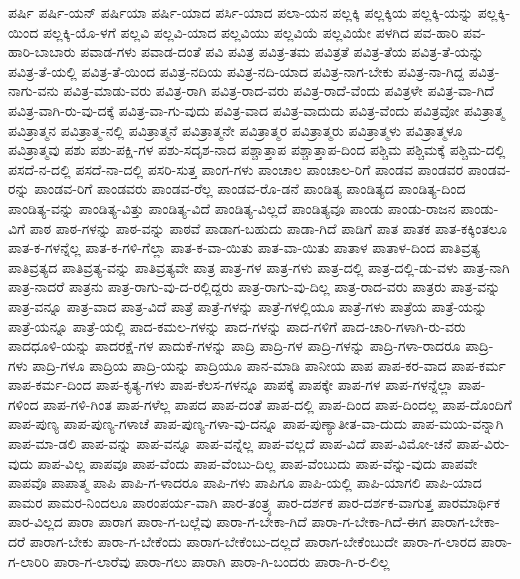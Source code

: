 {ಪರ್ಷಿ
ಪರ್ಷಿ-ಯನ್
ಪರ್ಷಿಯಾ
ಪರ್ಷಿ-ಯಾದ
ಪರ್ಸಿ-ಯಾದ
ಪಲಾ-ಯನ
ಪಲ್ಲಕ್ಕಿ
ಪಲ್ಲಕ್ಕಿಯ
ಪಲ್ಲಕ್ಕಿ-ಯನ್ನು
ಪಲ್ಲಕ್ಕಿ-ಯಿಂದ
ಪಲ್ಲಕ್ಕಿ-ಯೊ-ಳಗೆ
ಪಲ್ಲವಿ
ಪಲ್ಲವಿ-ಯಾದ
ಪಲ್ಲವಿಯು
ಪಲ್ಲವಿಯೆ
ಪಲ್ಲವಿಯೇ
ಪಳಗಿದ
ಪವ-ಹಾರಿ
ಪವ-ಹಾರಿ-ಬಾಬಾರು
ಪವಾಡ-ಗಳು
ಪವಾಡ-ದಂತೆ
ಪವಿ
ಪವಿತ್ರ
ಪವಿತ್ರ-ತಮ
ಪವಿತ್ರತೆ
ಪವಿತ್ರ-ತೆಯ
ಪವಿತ್ರ-ತೆ-ಯನ್ನು
ಪವಿತ್ರ-ತೆ-ಯಲ್ಲಿ
ಪವಿತ್ರ-ತೆ-ಯಿಂದ
ಪವಿತ್ರ-ನದಿಯ
ಪವಿತ್ರ-ನದಿ-ಯಾದ
ಪವಿತ್ರ-ನಾಗ-ಬೇಕು
ಪವಿತ್ರ-ನಾ-ಗಿದ್ದ
ಪವಿತ್ರ-ನಾಗು-ವನು
ಪವಿತ್ರ-ಮಾಡು-ವರು
ಪವಿತ್ರ-ರಾಗಿ
ಪವಿತ್ರ-ರಾದ-ವರು
ಪವಿತ್ರ-ರಾದೆ-ವೆಂದು
ಪವಿತ್ರಳೇ
ಪವಿತ್ರ-ವಾ-ಗಿದೆ
ಪವಿತ್ರ-ವಾಗಿ-ರು-ವು-ದಕ್ಕೆ
ಪವಿತ್ರ-ವಾ-ಗು-ವುದು
ಪವಿತ್ರ-ವಾದ
ಪವಿತ್ರ-ವಾದುದು
ಪವಿತ್ರ-ವೆಂದು
ಪವಿತ್ರವೋ
ಪವಿತ್ರಾತ್ಮ
ಪವಿತ್ರಾತ್ಮನ
ಪವಿತ್ರಾತ್ಮ-ನಲ್ಲಿ
ಪವಿತ್ರಾತ್ಮನೆ
ಪವಿತ್ರಾತ್ಮನೇ
ಪವಿತ್ರಾತ್ಮರ
ಪವಿತ್ರಾತ್ಮರು
ಪವಿತ್ರಾತ್ಮಳು
ಪವಿತ್ರಾತ್ಮಳೂ
ಪವಿತ್ರಾತ್ಮವು
ಪಶು
ಪಶು-ಪಕ್ಷಿ-ಗಳ
ಪಶು-ಸದೃಶ-ನಾದ
ಪಶ್ಚಾತ್ತಾಪ
ಪಶ್ಚಾತ್ತಾಪ-ದಿಂದ
ಪಶ್ಚಿಮ
ಪಶ್ಚಿಮಕ್ಕೆ
ಪಶ್ಚಿಮ-ದಲ್ಲಿ
ಪಸದೆ-ನ-ದಲ್ಲಿ
ಪಸದೆ-ನಾ-ದಲ್ಲಿ
ಪಸರಿ-ಸುತ್ತ
ಪಾಂಗ-ಗಳು
ಪಾಂಚಾಲ
ಪಾಂಚಾಲ-ರಿಗೆ
ಪಾಂಡವ
ಪಾಂಡವರ
ಪಾಂಡವ-ರನ್ನು
ಪಾಂಡವ-ರಿಗೆ
ಪಾಂಡವರು
ಪಾಂಡವ-ರೆಲ್ಲ
ಪಾಂಡವ-ರೊ-ಡನೆ
ಪಾಂಡಿತ್ಯ
ಪಾಂಡಿತ್ಯದ
ಪಾಂಡಿತ್ಯ-ದಿಂದ
ಪಾಂಡಿತ್ಯ-ವನ್ನು
ಪಾಂಡಿತ್ಯ-ವಿತ್ತು
ಪಾಂಡಿತ್ಯ-ವಿದೆ
ಪಾಂಡಿತ್ಯ-ವಿಲ್ಲದೆ
ಪಾಂಡಿತ್ಯವೂ
ಪಾಂಡು
ಪಾಂಡು-ರಾಜನ
ಪಾಂಡು-ವಿಗೆ
ಪಾಠ
ಪಾಠ-ಗಳನ್ನು
ಪಾಠ-ವನ್ನು
ಪಾಠವೆ
ಪಾಡಾಗ-ಬಹುದು
ಪಾಡಾ-ಗಿದೆ
ಪಾಡಿಗೆ
ಪಾತ
ಪಾತಕ
ಪಾತ-ಕಕ್ಕಿಂತಲೂ
ಪಾತ-ಕ-ಗಳನ್ನೆಲ್ಲ
ಪಾತ-ಕ-ಗಳಿ-ಗೆಲ್ಲಾ
ಪಾತ-ಕ-ವಾ-ಯಿತು
ಪಾತ-ವಾ-ಯಿತು
ಪಾತಾಳ
ಪಾತಾಳ-ದಿಂದ
ಪಾತಿವ್ರತ್ಯ
ಪಾತಿವ್ರತ್ಯದ
ಪಾತಿವ್ರತ್ಯ-ವನ್ನು
ಪಾತಿವ್ರತ್ಯವೇ
ಪಾತ್ರ
ಪಾತ್ರ-ಗಳ
ಪಾತ್ರ-ಗಳು
ಪಾತ್ರ-ದಲ್ಲಿ
ಪಾತ್ರ-ದಲ್ಲಿ-ಡು-ವಳು
ಪಾತ್ರ-ನಾಗಿ
ಪಾತ್ರ-ನಾದರೆ
ಪಾತ್ರನು
ಪಾತ್ರ-ರಾಗು-ವು-ದ-ರಲ್ಲಿದ್ದರು
ಪಾತ್ರ-ರಾಗು-ವು-ದಿಲ್ಲ
ಪಾತ್ರ-ರಾದ-ವರು
ಪಾತ್ರರು
ಪಾತ್ರ-ವನ್ನು
ಪಾತ್ರ-ವನ್ನೂ
ಪಾತ್ರ-ವಾದ
ಪಾತ್ರ-ವಿದೆ
ಪಾತ್ರೆ
ಪಾತ್ರೆ-ಗಳನ್ನು
ಪಾತ್ರೆ-ಗಳಲ್ಲಿಯೂ
ಪಾತ್ರೆ-ಗಳು
ಪಾತ್ರೆಯ
ಪಾತ್ರೆ-ಯನ್ನು
ಪಾತ್ರೆ-ಯನ್ನೂ
ಪಾತ್ರೆ-ಯಲ್ಲಿ
ಪಾದ-ಕಮಲ-ಗಳನ್ನು
ಪಾದ-ಗಳನ್ನು
ಪಾದ-ಗಳಿಗೆ
ಪಾದ-ಚಾರಿ-ಗಳಾಗಿ-ರು-ವರು
ಪಾದಧೂಳಿ-ಯನ್ನು
ಪಾದರಕ್ಷೆ-ಗಳ
ಪಾದುಕೆ-ಗಳನ್ನು
ಪಾದ್ರಿ
ಪಾದ್ರಿ-ಗಳ
ಪಾದ್ರಿ-ಗಳನ್ನು
ಪಾದ್ರಿ-ಗಳಾ-ರಾದರೂ
ಪಾದ್ರಿ-ಗಳು
ಪಾದ್ರಿ-ಗಳೂ
ಪಾದ್ರಿಯ
ಪಾದ್ರಿ-ಯನ್ನು
ಪಾದ್ರಿಯೂ
ಪಾನ-ಮಾಡಿ
ಪಾನೀಯ
ಪಾಪ
ಪಾಪ-ಕರ-ವಾದ
ಪಾಪ-ಕರ್ಮ
ಪಾಪ-ಕರ್ಮ-ದಿಂದ
ಪಾಪ-ಕೃತ್ಯ-ಗಳು
ಪಾಪ-ಕೆಲಸ-ಗಳನ್ನೂ
ಪಾಪಕ್ಕೆ
ಪಾಪಕ್ಕೇ
ಪಾಪ-ಗಳ
ಪಾಪ-ಗಳನ್ನೆಲ್ಲಾ
ಪಾಪ-ಗಳಿಂದ
ಪಾಪ-ಗಳಿ-ಗಿಂತ
ಪಾಪ-ಗಳೆಲ್ಲ
ಪಾಪದ
ಪಾಪ-ದಂತೆ
ಪಾಪ-ದಲ್ಲಿ
ಪಾಪ-ದಿಂದ
ಪಾಪ-ದಿಂದಲ್ಲ
ಪಾಪ-ದೊಂದಿಗೆ
ಪಾಪ-ಪುಣ್ಯ
ಪಾಪ-ಪುಣ್ಯ-ಗಳಾಚೆ
ಪಾಪ-ಪುಣ್ಯ-ಗಳಾ-ವು-ದನ್ನೂ
ಪಾಪ-ಪುಣ್ಯಾತೀತ-ವಾ-ದುದು
ಪಾಪ-ಮಯ-ವನ್ನಾಗಿ
ಪಾಪ-ಮಾ-ಡಲಿ
ಪಾಪ-ವನ್ನು
ಪಾಪ-ವನ್ನೂ
ಪಾಪ-ವನ್ನೆಲ್ಲ
ಪಾಪ-ವಲ್ಲದೆ
ಪಾಪ-ವಿದೆ
ಪಾಪ-ವಿಮೋ-ಚನೆ
ಪಾಪ-ವಿರು-ವುದು
ಪಾಪ-ವಿಲ್ಲ
ಪಾಪವೂ
ಪಾಪ-ವೆಂದು
ಪಾಪ-ವೆಂಬು-ದಿಲ್ಲ
ಪಾಪ-ವೆಂಬುದು
ಪಾಪ-ವೆನ್ನು-ವುದು
ಪಾಪವೇ
ಪಾಪವೊ
ಪಾಪಾತ್ಮ
ಪಾಪಿ
ಪಾಪಿ-ಗ-ಳಾದರೂ
ಪಾಪಿ-ಗಳು
ಪಾಪಿಗೂ
ಪಾಪಿ-ಯಲ್ಲಿ
ಪಾಪಿ-ಯಾಗಲಿ
ಪಾಪಿ-ಯಾದ
ಪಾಮರ
ಪಾಮರ-ನಿಂದಲೂ
ಪಾರಂಪರ್ಯ-ವಾಗಿ
ಪಾರ-ತಂತ್ರ್ಯ
ಪಾರ-ದರ್ಶಕ
ಪಾರ-ದರ್ಶಕ-ವಾಗುತ್ತ
ಪಾರಮಾರ್ಥಿಕ
ಪಾರ-ವಿಲ್ಲದ
ಪಾರಾ
ಪಾರಾಗ
ಪಾರಾ-ಗ-ಬಲ್ಲೆವು
ಪಾರಾ-ಗ-ಬೇಕಾ-ಗಿದೆ
ಪಾರಾ-ಗ-ಬೇಕಾ-ಗಿದೆ-ಈಗ
ಪಾರಾಗ-ಬೇಕಾ-ದರೆ
ಪಾರಾಗ-ಬೇಕು
ಪಾರಾ-ಗ-ಬೇಕೆಂದು
ಪಾರಾಗ-ಬೇಕೆಂಬು-ದಲ್ಲದೆ
ಪಾರಾಗ-ಬೇಕೆಂಬುದೇ
ಪಾರಾ-ಗ-ಲಾರದ
ಪಾರಾ-ಗ-ಲಾರಿರಿ
ಪಾರಾ-ಗ-ಲಾರೆವು
ಪಾರಾ-ಗಲು
ಪಾರಾಗಿ
ಪಾರಾ-ಗಿ-ಬಂದರು
ಪಾರಾ-ಗಿ-ರ-ಲಿಲ್ಲ
}
